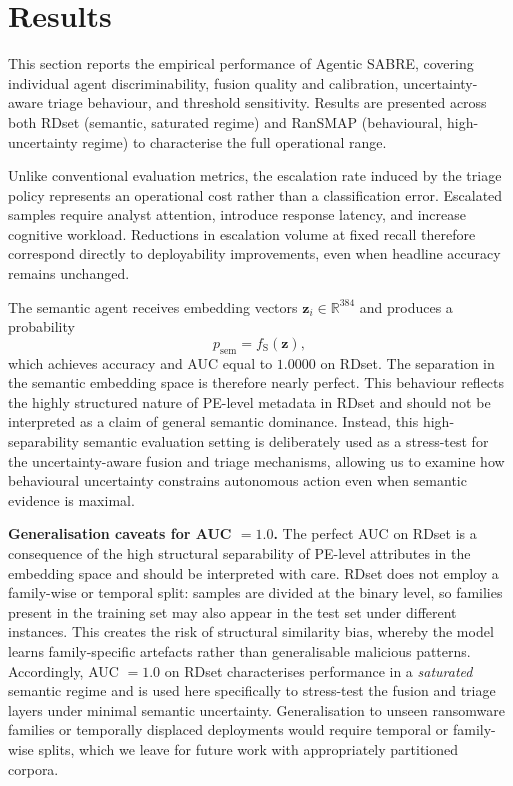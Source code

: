 \documentclass[3p]{elsarticle}
\begin{document}
\section{Results}
\label{sec:results}

This section reports the empirical performance of Agentic SABRE, covering individual agent
discriminability, fusion quality and calibration, uncertainty-aware triage behaviour, and
threshold sensitivity. Results are presented across both RDset (semantic, saturated regime)
and RanSMAP (behavioural, high-uncertainty regime) to characterise the full operational range.

Unlike conventional evaluation metrics, the escalation rate induced by the triage policy represents an operational cost rather than a classification error. Escalated samples require analyst attention, introduce response latency, and increase cognitive workload. Reductions in escalation volume at fixed recall therefore correspond directly to deployability improvements, even when headline accuracy remains unchanged.

The semantic agent receives embedding vectors \(\mathbf{z}_i \in \mathbb{R}^{384}\) and produces a probability
\begin{equation}
p_{\mathrm{sem}} = f_{\mathrm{S}}(\mathbf{z}),
\label{eq:psem}
\end{equation}
which achieves accuracy and AUC equal to \(1.0000\) on RDset. The separation in the semantic embedding space is therefore nearly perfect. This behaviour reflects the highly structured nature of PE-level metadata in RDset and should not be interpreted as a claim of general semantic dominance. Instead, this high-separability semantic evaluation setting is deliberately used as a stress-test for the uncertainty-aware fusion and triage mechanisms, allowing us to examine how behavioural uncertainty constrains autonomous action even when semantic evidence is maximal.

\noindent\textbf{Generalisation caveats for AUC $= 1.0$.}
The perfect AUC on RDset is a consequence of the high structural separability of PE-level
attributes in the embedding space and should be interpreted with care. RDset does not employ
a family-wise or temporal split: samples are divided at the binary level, so families present
in the training set may also appear in the test set under different instances. This creates
the risk of structural similarity bias, whereby the model learns family-specific artefacts
rather than generalisable malicious patterns. Accordingly, AUC $= 1.0$ on RDset characterises
performance in a \emph{saturated} semantic regime and is used here specifically to stress-test
the fusion and triage layers under minimal semantic uncertainty. Generalisation to unseen
ransomware families or temporally displaced deployments would require temporal or family-wise
splits, which we leave for future work with appropriately partitioned corpora.
\end{document}
